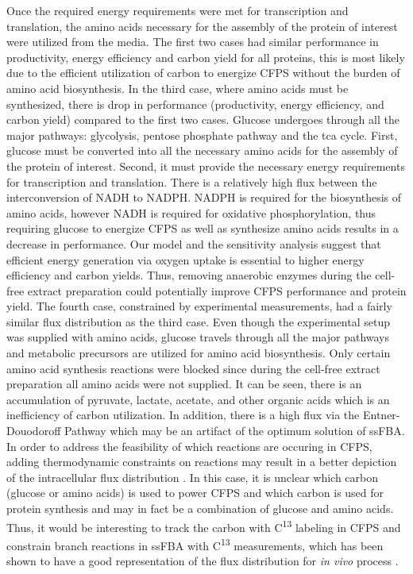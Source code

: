\documentclass[journal=asbcd6,manuscript=article]{achemso}
\begin{document}
Once the required energy requirements were met for transcription and translation, the amino acids necessary for the assembly of the protein of interest were utilized from the media.
The first two cases had similar performance in productivity, energy efficiency and carbon yield for all proteins, this is most likely due to the efficient utilization of carbon to energize CFPS without the burden of amino acid biosynthesis. 
In the third case, where amino acids must be synthesized, there is drop in performance (productivity, energy efficiency, and carbon yield) compared to the first two cases. 
Glucose undergoes through all the major pathways: glycolysis, pentose phosphate pathway and the tca cycle. 
First, glucose must be converted into all the necessary amino acids for the assembly of the protein of interest. 
Second, it must provide the necessary energy requirements for transcription and translation. 
There is a relatively high flux between the interconversion of NADH to NADPH.
NADPH is required for the biosynthesis of amino acids, however NADH is required for oxidative phosphorylation, thus requiring glucose to energize CFPS as well as synthesize amino acids results in a decrease in performance.
Our model and the sensitivity analysis suggest that efficient energy generation via oxygen uptake is essential to higher energy efficiency and carbon yields.
Thus, removing anaerobic enzymes during the cell-free extract preparation could potentially improve CFPS performance and protein yield.
The fourth case, constrained by experimental measurements, had a fairly similar flux distribution as the third case. 
Even though the experimental setup was supplied with amino acids, glucose travels through all the major pathways and metabolic precursors are utilized for amino acid biosynthesis. 
Only certain amino acid synthesis reactions were blocked since during the cell-free extract preparation all amino acids were not supplied.  
It can be seen, there is an accumulation of pyruvate, lactate, acetate, and other organic acids which is an inefficiency of carbon utilization.
In addition, there is a high flux via the Entner-Douodoroff Pathway which may be an artifact of the optimum solution of ssFBA.
In order to address the feasibility of which reactions are occuring in CFPS, adding thermodynamic constraints on reactions may result in a better depiction of the intracellular flux distribution \cite{Henry:2007,Hamilton:2013}. 
In this case, it is unclear which carbon (glucose or amino acids) is used to power CFPS and which carbon is used for protein synthesis and may in fact be a combination of glucose and amino acids.
Thus, it would be interesting to track the carbon with C\textsuperscript{13} labeling in CFPS and constrain branch reactions in ssFBA with C\textsuperscript{13} measurements, which has been shown to have a good representation of the flux distribution for \textit{in vivo} process \cite{Zamboni:2009}.   
\end{document}
